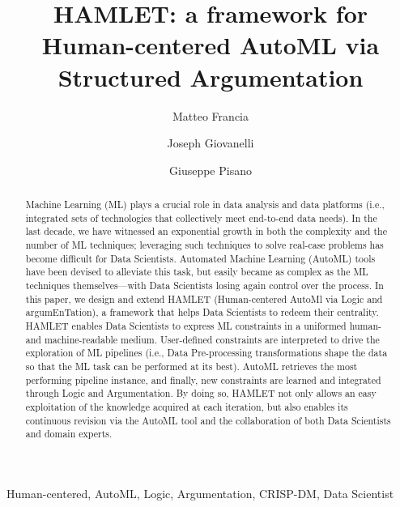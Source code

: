 \documentclass[5p,times]{elsarticle}
\begin{document}
\sloppy

\begin{frontmatter}
\title{HAMLET: a framework for Human-centered AutoML via Structured Argumentation}


\author[1]{Matteo Francia}
\author[1]{Joseph Giovanelli}
\author[2]{Giuseppe Pisano}
\address[1]{DISI -- University of Bologna, Italy}
\address[2]{Alma AI -- University of Bologna, Italy}

\begin{abstract}
Machine Learning (ML) plays a crucial role in data analysis and data platforms (i.e., integrated sets of technologies that collectively meet end-to-end data needs).
In the last decade, we have witnessed an exponential growth in both the complexity and the number of ML techniques; leveraging such techniques to solve real-case problems has become difficult for Data Scientists.
Automated Machine Learning (AutoML) tools have been devised to alleviate this task, but easily became as complex as the ML techniques themselves---with Data Scientists losing again control over the process.
In this paper, we design and extend HAMLET (Human-centered AutoMl via Logic and argumEnTation), a framework that helps Data Scientists to redeem their centrality.
HAMLET enables Data Scientists to express ML constraints in a uniformed human- and machine-readable medium.
User-defined constraints are interpreted to drive the exploration of ML pipelines (i.e., Data Pre-processing transformations shape the data so that the ML task can be performed at its best). AutoML retrieves the most performing pipeline instance, and finally, new constraints are learned and integrated through Logic and Argumentation.
By doing so, HAMLET not only allows an easy exploitation of the knowledge acquired at each iteration, but also enables its continuous revision via the AutoML tool and the collaboration of both Data Scientists and domain experts.
\end{abstract}

\begin{keyword}
Human-centered, AutoML, Logic, Argumentation, CRISP-DM, Data Scientist
\end{keyword}
\end{frontmatter}
\end{document}
